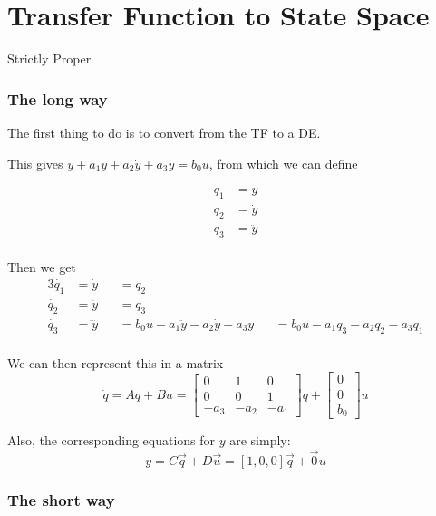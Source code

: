 \documentclass{../templates/topic}
\begin{document}
\chapter{Transfer Function to State Space}

\begin{section}{Strictly Proper}
	
	\subsection{The long way}
	
	The first thing to do is to convert from the TF to a DE.
	
	This gives $\dddot{y} + a_1\ddot{y} + a_2\dot{y} + a_3y = b_0u$, from which we can define
	
	\begin{align*}
		q_1 &= y \\
		q_2 &= \dot{y} \\
		q_3 &= \ddot{y} \\
	\end{align*}
		
	Then we get
	\begin{alignat*}{3}
		\dot{q_1}&=\dot{y}&&= q_2 &&\\
		\dot{q_2}&=\ddot{y}&&= q_3 &&\\
		\dot{q_3}&=\dddot{y}&&= b_0u - a_1\ddot{y} - a_2\dot{y} - a_3y &&= b_0u - a_1 q_3 - a_2 q_2 - a_3 q_1	\\
	\end{alignat*}
	
	We can then represent this in a matrix
	\[
	\dot{q}=Aq+Bu=
		\begin{bmatrix}
			0 & 1 & 0 \\
			0 & 0 & 1 \\
			-a_3 & -a_2 & -a_1
		\end{bmatrix}
		q +
		\begin{bmatrix}
			0 \\ 0 \\ b_0
		\end{bmatrix}
		u
	\]
	
	Also, the corresponding equations for $y$ are simply:
	\[
	y = C\vec{q}+D\vec{u}=[1, 0, 0]\vec{q} + \vec{0} u
	\]
	
	\subsection{The short way}
	

\end{section}
\end{document}
